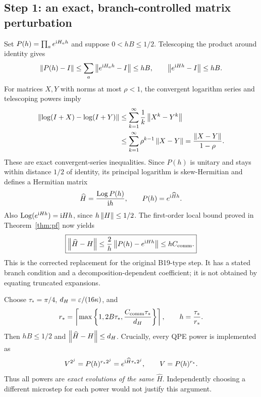 \subsection{Step 1: an exact, branch-controlled matrix perturbation}
Set $P(h)=\prod_a e^{\mathrm{i} H_ah}$ and suppose $0<hB\leq1/2$. Telescoping the product around identity gives
\begin{equation}
 \left\lVert P(h)-I\right\rVert\leq\sum_a\left\lVert e^{\mathrm{i} H_ah}-I\right\rVert\leq hB,
 \qquad\left\lVert e^{\mathrm{i} Hh}-I\right\rVert\leq hB.
\end{equation}
For matrices $X,Y$ with norms at most $\rho<1$, the convergent logarithm series and telescoping powers imply
\begin{align}
 \left\lVert \log(I+X)-\log(I+Y)\right\rVert
 &\leq\sum_{k=1}^{\infty}\frac{1}{k}\left\lVert X^k-Y^k\right\rVert\\
 &\leq\sum_{k=1}^{\infty}\rho^{k-1}\left\lVert X-Y\right\rVert
 =\frac{\left\lVert X-Y\right\rVert}{1-\rho}.
\end{align}
These are exact convergent-series inequalities. Since $P(h)$ is unitary and stays within distance $1/2$ of identity, its principal logarithm is skew-Hermitian and defines a Hermitian matrix
\begin{equation}
 \widehat H=\frac{\operatorname{Log}P(h)}{\mathrm{i} h},\qquad
 P(h)=e^{\mathrm{i}\widehat Hh}.
\end{equation}
Also $\operatorname{Log}(e^{\mathrm{i} Hh})=\mathrm{i} Hh$, since $h\left\lVert H\right\rVert\leq1/2$. The first-order local bound proved in Theorem~\ref{thm:pf} now yields
\begin{equation}\label{eq:corrected-matrix}
 \boxed{\left\lVert \widehat H-H\right\rVert\leq\frac{2}{h}\left\lVert P(h)-e^{\mathrm{i} Hh}\right\rVert
 \leq hC_{\mathrm{comm}}.}
\end{equation}
This is the corrected replacement for the original B19-type step. It has a stated branch condition and a decomposition-dependent coefficient; it is not obtained by equating truncated expansions.

Choose $\tau_*=\pi/4$, $d_H=\varepsilon/(16\kappa)$, and
\begin{equation}\label{eq:microstep}
 r_*=\left\lceil\max\left\{1,2B\tau_*,\frac{C_{\mathrm{comm}}\tau_*}{d_H}\right\}\right\rceil,
 \qquad h=\frac{\tau_*}{r_*}.
\end{equation}
Then $hB\leq1/2$ and $\left\lVert \widehat H-H\right\rVert\leq d_H$. Crucially, every QPE power is implemented as
\begin{equation}\label{eq:consistent}
 V^{2^j}=P(h)^{r_*2^j}=e^{\mathrm{i}\widehat H\tau_*2^j},\qquad V=P(h)^{r_*}.
\end{equation}
Thus all powers are \emph{exact evolutions of the same $\widehat H$}. Independently choosing a different microstep for each power would not justify this argument.

